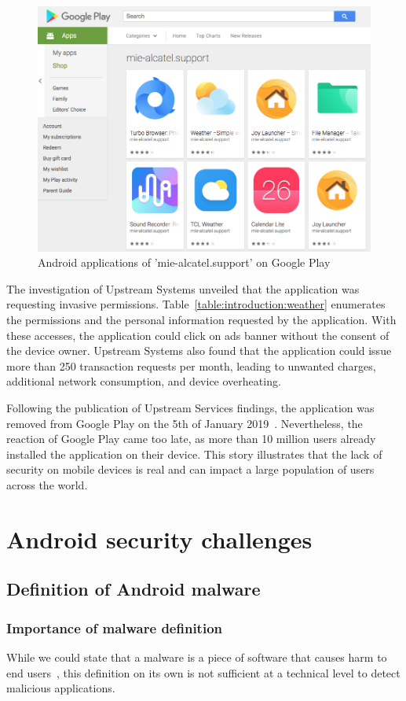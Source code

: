 \begin{figure}[!ht]
        \centering
	\includegraphics[width=0.75\linewidth]{figures/introduction/weather.png}
	\caption{Android applications of 'mie-alcatel.support' on Google Play}
	\label{figure:introduction:weather}
\end{figure}

The investigation of Upstream Systems unveiled that the application was requesting invasive permissions.
Table~\ref{table:introduction:weather} enumerates the permissions and the personal information requested by the application.
With these accesses, the application could click on ads banner without the consent of the device owner.
Upstream Systems also found that the application could issue more than 250 transaction requests per month, leading to unwanted charges, additional network consumption, and device overheating.

Following the publication of Upstream Services findings, the application was removed from Google Play on the 5th of January 2019~\cite{upstream_systems_secure-d_2019}.
Nevertheless, the reaction of Google Play came too late, as more than 10 million users already installed the application on their device.
This story illustrates that the lack of security on mobile devices is real and can impact a large population of users across the world.



\section{Android security challenges}
\subsection{Definition of Android malware}
\subsubsection{Importance of malware definition}
While we could state that a malware is a piece of software that causes harm to end users~\cite{oxford_dictionnary_malware_2019}, this definition on its own is not sufficient at a technical level to detect malicious applications.

